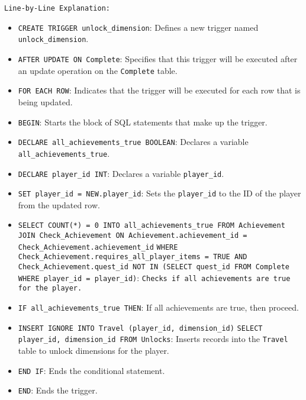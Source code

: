 \documentclass{article}
\begin{document}
\texttt{Line-by-Line Explanation:}
\begin{itemize}
    \item \lstinline|CREATE TRIGGER unlock_dimension|: Defines a new trigger named \linebreak \lstinline|unlock_dimension|.
    \item \lstinline|AFTER UPDATE ON Complete|: Specifies that this trigger will be executed after an update operation on the \lstinline|Complete| table.
    \item \lstinline|FOR EACH ROW|: Indicates that the trigger will be executed for each row that is being updated.
    \item \lstinline|BEGIN|: Starts the block of SQL statements that make up the trigger.
    \item \lstinline|DECLARE all_achievements_true BOOLEAN|: Declares a variable \lstinline|all_achievements_true|.
    \item \lstinline|DECLARE player_id INT|: Declares a variable \lstinline|player_id|.
    \item \lstinline|SET player_id = NEW.player_id|: Sets the \lstinline|player_id| to the ID of the player from the updated row.
    \item \lstinline|SELECT COUNT(*) = 0 INTO all_achievements_true FROM Achievement| \linebreak \lstinline|JOIN Check_Achievement ON Achievement.achievement_id = Check_Achievement.achievement_id| \linebreak \lstinline|WHERE Check_Achievement.requires_all_player_items = TRUE AND| \linebreak \lstinline|Check_Achievement.quest_id NOT IN (SELECT quest_id FROM Complete| \linebreak \lstinline|WHERE player_id = player_id)|: \linebreak \lstinline|Checks if all achievements are true for the player.|
    \item \lstinline|IF all_achievements_true THEN|: If all achievements are true, then proceed.
    \item \lstinline|INSERT IGNORE INTO Travel (player_id, dimension_id)| \linebreak \lstinline|SELECT player_id, dimension_id FROM Unlocks|: Inserts records into the \lstinline|Travel| table to unlock dimensions for the player.
    \item \lstinline|END IF|: Ends the conditional statement.
    \item \lstinline|END|: Ends the trigger.
\end{itemize}
\end{document}

